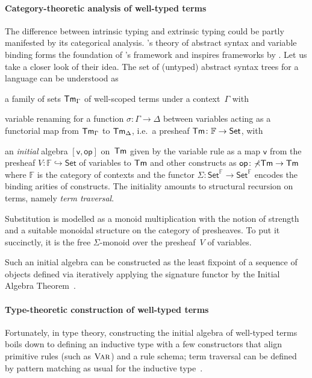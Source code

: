 \documentclass[BiSig.tex]{subfiles}
\begin{document}
\paragraph{Category-theoretic analysis of well-typed terms}
The difference between intrinsic typing and extrinsic typing could be partly manifested by its categorical analysis.
\citet{Fiore1999}{'s} theory of abstract syntax and variable binding forms the foundation of \citet{Fiore2022}'s framework and inspires frameworks by \citet{Allais2021,Ahrens2022}.
Let us take a closer look of their idea.
The set of (untyped) abstract syntax trees for a language can be understood as
\begin{enumerate*}
  \item a family of sets $\mathsf{Tm}_{\Gamma}$ of well-scoped terms under a context~$\Gamma$ with
  \item variable renaming for a function $\sigma\colon \Gamma \to \Delta$ between variables acting as a functorial map from $\mathsf{Tm}_{\Gamma}$ to $\mathsf{Tm}_{\Delta}$, i.e.\ a presheaf $\mathsf{Tm}\colon \mathbb{F} \to \mathsf{Set}$, with
  \item an \emph{initial} algebra $[\mathsf{v}, \mathsf{op}]$ on~$\mathsf{Tm}$ given by the variable rule as a map $\mathsf{v}$ from the presheaf $V\colon \mathbb{F} \hookrightarrow \mathsf{Set}$ of variables to $\mathsf{Tm}$ and other constructs as $\mathsf{op}\colon \mathbb{\Sigma}\mathsf{Tm} \to \mathsf{Tm}$ where $\mathbb{F}$ is the category of contexts and the functor $\mathbb{\Sigma}\colon \mathsf{Set}^\mathbb{F} \to \mathsf{Set}^\mathbb{F}$ encodes the binding arities of constructs. 
  The initiality amounts to structural recursion on terms, namely \emph{term traversal}.
\end{enumerate*}
Substitution is modelled as a monoid multiplication with the notion of strength and a suitable monoidal structure on the category of presheaves.
To put it succinctly, it is the free $\mathbb{\Sigma}$-monoid over the presheaf~$V$ of variables.

Such an initial algebra can be constructed as the least fixpoint of a sequence of objects defined via iteratively applying the signature functor by the Initial Algebra Theorem~\cite{Trnkova1975}.

\paragraph{Type-theoretic construction of well-typed terms}
Fortunately, in type theory, constructing the initial algebra of well-typed terms boils down to defining an inductive type with a few constructors that align primitive rules (such as $\textnormal{\textsc{Var}}$) and a rule schema; term traversal can be defined by pattern matching as usual for the inductive type~\citep{Fiore2022}.
\end{document}
